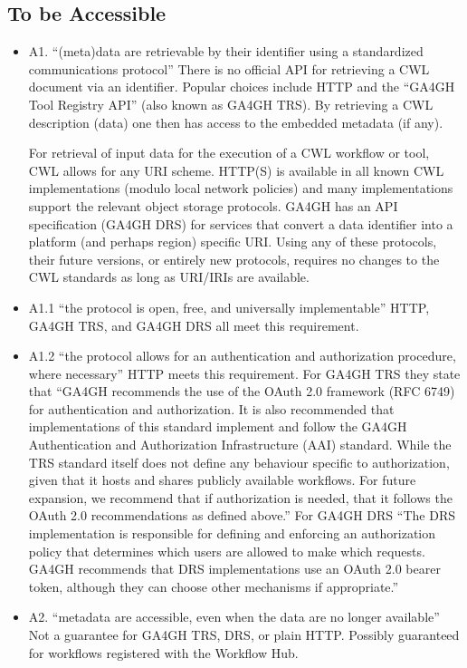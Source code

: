 \subsection{To be Accessible}
\begin{itemize}
\item A1. “(meta)data are retrievable by their identifier using a standardized communications protocol”
There is no official API for retrieving a CWL document via an identifier. Popular choices include HTTP and the “GA4GH Tool Registry API” (also known as GA4GH TRS). By retrieving a CWL description (data) one then has access to the embedded metadata (if any).

For retrieval of input data for the execution of a CWL workflow or tool, CWL allows for any URI scheme. HTTP(S) is available in all known CWL implementations (modulo local network policies) and many implementations support the relevant object storage protocols. GA4GH has an API specification (GA4GH DRS) for services that convert a data identifier into a platform (and perhaps region) specific URI. Using any of these protocols, their future versions, or entirely new protocols, requires no changes to the CWL standards as long as URI/IRIs are available.
\item A1.1 “the protocol is open, free, and universally implementable”
HTTP, GA4GH TRS, and GA4GH DRS all meet this requirement.
\item A1.2 “the protocol allows for an authentication and authorization procedure, where necessary”
HTTP meets this requirement. For GA4GH TRS they state that “GA4GH recommends the use of the OAuth 2.0 framework (RFC 6749) for authentication and authorization. It is also recommended that implementations of this standard implement and follow the GA4GH Authentication and Authorization Infrastructure (AAI) standard.
While the TRS standard itself does not define any behaviour specific to authorization, given that it hosts and shares publicly available workflows. For future expansion, we recommend that if authorization is needed, that it follows the OAuth 2.0 recommendations as defined above.”
For GA4GH DRS “The DRS implementation is responsible for defining and enforcing an authorization policy that determines which users are allowed to make which requests. GA4GH recommends that DRS implementations use an OAuth 2.0 bearer token, although they can choose other mechanisms if appropriate.”
\item A2. “metadata are accessible, even when the data are no longer available”
Not a guarantee for GA4GH TRS, DRS, or plain HTTP. Possibly guaranteed for workflows registered with the Workflow Hub.
\end{itemize}
